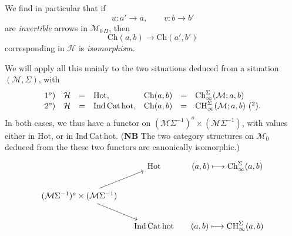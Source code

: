 \documentclass[11pt]{article}
\newcommand{\MOP}{\mathcal{M}_{0\,\Pi}}
\begin{document}
We find in particular that if
\[
u : a'\longrightarrow a, \qquad v : b\longrightarrow b'
\]
are \textit{invertible} arrows in $\MOP$, then
\[
\mathrm{Ch}(a,b)\longrightarrow\mathrm{Ch}(a',b')
\]
corresponding in $\mathcal{H}$ is \textit{isomorphism.}

We will apply all this mainly to the two situations deduced from a situation $(\mathcal{M},\Sigma)$, with
\[
\begin{array}{rlcllcl}
1^o) & \mathcal{H} & = & \mathrm{Hot}, & \mathrm{Ch}(a,b) & = & \mathrm{Ch}^{\Sigma}_{\infty}(\mathcal{M};a,b)\\
2^o) & \mathcal{H} & = & \mathrm{Ind\,Cat\,hot}, & \mathrm{Ch}(a,b) & = & \mathrm{CH}^{\Sigma}_{\infty}(\mathcal{M};a,b)\ \text{(\footnotemark[2])}.
\end{array}
\]
In both cases, we thus have a functor on $(\mathcal{M}\Sigma^{-1})^o\times(\mathcal{M}\Sigma^{-1})$, with values either in Hot, or in Ind\,Cat\,hot. (\textbf{NB} The two category structures on $\mathcal{M}_0$ deduced from the %
these two functors are canonically isomorphic.)
\[
\begin{tikzcd}[column sep=small]
 & \mathrm{Hot} & (a,b)\longmapsto\mathrm{Ch}^{\Sigma}_{\infty}(a,b)\\
(\mathcal{M}\Sigma^{-1})^o\times(\mathcal{M}\Sigma^{-1}) \arrow[ur] \arrow[dr] & & \\
 & \mathrm{Ind\,Cat\,hot} & (a,b)\longmapsto\mathrm{CH}^{\Sigma}_{\infty}(a,b)
\end{tikzcd}
\]
\end{document}
